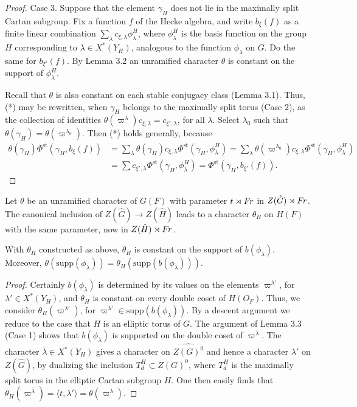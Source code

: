 \documentclass{amsart}
\newenvironment{cthm}[1]
  {\renewcommand\thethm{\sc #1}\thm}
  {\endthm}
\newcommand\Fr{\text{$F\hskip-.1em r$}}
\begin{document}
\begin{proof}
Case 3.  Suppose that the element $\gamma_H$ does
not lie in the maximally split Cartan subgroup.  
Fix a function $f$ of the Hecke algebra, and write
$b_\xi(f)$ as a finite linear combination $\sum_{\lambda}c_{\xi,\lambda}
\phi^H_\lambda$, where $\phi^H_\lambda$ is the basis function on
the group $H$
corresponding to $\lambda\in X^*(Y_H)$,
analogous to the function $\phi_\lambda$ on $G$.  Do the same
for $b_{\xi'}(f)$.  By Lemma 3.2 an unramified
character $\theta$ is constant on the support of $\phi^H_\lambda$.


Recall that $\theta$ is also constant on each
stable conjugacy class (Lemma 3.1).
Thus, (*) may be rewritten, when $\gamma_H$ belongs to the maximally
split torus (Case 2), as the collection of identities 
$\theta(\varpi^\lambda) c_{\xi,\lambda}  = c_{\xi',\lambda}$, for
all $\lambda$.  Select $\lambda_0$ such that $\theta(\gamma_H)
 = \theta(\varpi^{\lambda_0})$.
Then (*) holds generally,
because
\begin{align*}
\theta(\gamma_H)\Phi^{\text{st}}(\gamma_H,b_\xi(f)) &= 
\sum_{\lambda}\theta(\gamma_H)c_{\xi,\lambda}
	\Phi^{\text{st}}(\gamma_H,\phi^H_\lambda)
 = \sum_\lambda
\theta(\varpi^{\lambda_0}) 
	c_{\xi,\lambda}\Phi^{\text{st}}(\gamma_H,\phi^H_\lambda)\\
 &= \sum c_{\xi',\lambda}\Phi^{\text{st}}(\gamma_H,\phi^H_\lambda) =
  \Phi^{\text{st}}(\gamma_H,b_{\xi'}(f)).
\end{align*}
\end{proof}
%

Let $\theta$ be an unramified character of $G(F)$ with parameter $t\rtimes \Fr$
in $Z(\hat G)\rtimes \Fr$.  The canonical inclusion of $Z(\hat G)\to Z(\hat H)$
leads to a character $\theta_H$ on $H(F)$ with the same parameter, now
in $Z(\hat H)\rtimes \Fr$.

\begin{cthm}{Lemma 3.4} With $\theta_H$ constructed as above, $\theta_H$ is
constant on the support of $b(\phi_\lambda)$.  Moreover,
$\theta(\text{supp}(\phi_\lambda)) = \theta_H(\text{supp}(b(\phi_\lambda)))$.
\end{cthm}

\begin{proof}
Certainly $b(\phi_\lambda)$ is determined by its values on the elements
$\varpi^{\lambda'}$, for $\lambda'\in X^*(Y_H)$, and $\theta_H$ is
constant on every double coset of $H(O_F)$.  Thus, we consider 
$\theta_H(\varpi^{\lambda'})$, for $\varpi^{\lambda'}\in\text{supp}(b(\phi_\lambda))$.
By a descent argument we reduce to the case that $H$ is an elliptic torus
of $G$.
The argument of Lemma 3.3 (Case 1) shows that $b(\phi_\lambda)$ is
supported on the double coset of $\varpi^{\bar\lambda}$.
The character $\bar\lambda\in X^*(Y_H)$
gives a character on $\widehat{Z(G)^0}$ and hence a character
$\lambda'$ on $Z(\hat G)$, by dualizing the inclusion
$T_d^H\subset Z(G)^0$, where $T_d^H$ is the maximally split
torus in the elliptic Cartan subgroup $H$.  One then easily finds that
$\theta_H(\varpi^{\bar\lambda}) = \langle t,\lambda'\rangle 
= \theta(\varpi^\lambda)$.
\end{proof}
\end{document}
